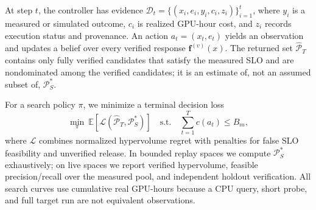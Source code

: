 At step $t$, the controller has evidence
$\mathcal D_t=\{(x_i,e_i,y_i,c_i,z_i)\}_{i=1}^t$, where $y_i$ is a
measured or simulated outcome, $c_i$ is realized GPU-hour cost, and $z_i$
records execution status and provenance.  An action $a_t=(x_t,e_t)$ yields an
observation and updates a belief over every verified response
$\mathbf f^{(v)}(x)$.  The returned set $\widehat{\mathcal P}_T$ contains only
fully verified candidates that satisfy the measured SLO and are nondominated
among the verified candidates; it is an estimate of, not an assumed subset
of, $\mathcal P_S^*$.

For a search policy $\pi$, we minimize a terminal decision loss
\begin{equation}
\min_{\pi}\
\mathbb E\!\left[\mathcal L
(\widehat{\mathcal P}_T,\mathcal P_S^*)\right]
\quad\text{s.t.}\quad
\sum_{t=1}^{T}c(a_t)\leq B_m,
\label{eq:budgeted-objective}
\end{equation}
where $\mathcal L$ combines normalized hypervolume regret with penalties for
false SLO feasibility and unverified release.  In bounded replay spaces we
compute $\mathcal P_S^*$ exhaustively; on live spaces we report verified
hypervolume, feasible precision/recall over the measured pool, and independent
holdout verification.  All search curves use cumulative real GPU-hours because
a CPU query, short probe, and full target run are not equivalent observations.
